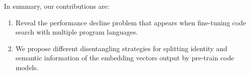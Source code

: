 In summary, our contributions are:
\begin{enumerate} 
\item Reveal the performance decline problem that appears when fine-tuning code search with multiple program languages.
\item We propose different disentangling strategies for splitting identity and semantic information of the embedding vectors output by pre-train code models.
\end{enumerate}


\begin{table}[htbp]
	\centering
	\caption{Performance comparisons with different fine-tuning program languages}
	\vspace{-5pt}
	\label{tab:comparison}%
	\vspace{-10	pt}
\end{table}%
